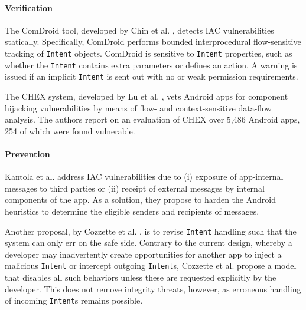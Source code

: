 \paragraph{Verification} The ComDroid tool, developed by Chin et al. \cite{CFGW:MOBISYS11}, detects IAC vulnerabilities statically. Specifically, ComDroid performs bounded interprocedural flow-sensitive tracking of {\tt Intent} objects. ComDroid is sensitive to {\tt Intent} properties, such as whether the {\tt Intent} contains extra parameters or defines an action. A warning is issued if an implicit {\tt Intent} is sent out with no or weak permission requirements.

The CHEX system, developed by Lu et al. \cite{LLWLJ:CCS12}, vets Android apps for component hijacking vulnerabilities by means of flow- and context-sensitive data-flow analysis. The authors report on an evaluation of CHEX over 5,486 Android apps, 254 of which were found vulnerable.  

\paragraph{Prevention} %
Kantola et al. \cite{KCHW:SPSM12} address IAC vulnerabilities due to (i) exposure of app-internal messages to third parties or (ii) receipt of external messages by internal components of the app. As a solution, they propose to harden the Android heuristics to determine the eligible senders and recipients of messages.

Another proposal, by Cozzette et al. \cite{CLMOABFKNR:IM13}, is to revise {\tt Intent} handling such that the system can only err on the safe side. Contrary to the current design, whereby a developer may inadvertently create opportunities for another app to inject a malicious {\tt Intent} or intercept outgoing {\tt Intent}s, Cozzette et al. propose a model that disables all such behaviors unless these are requested explicitly by the developer. This does not remove integrity threats, however, as erroneous handling of incoming {\tt Intent}s remains possible.